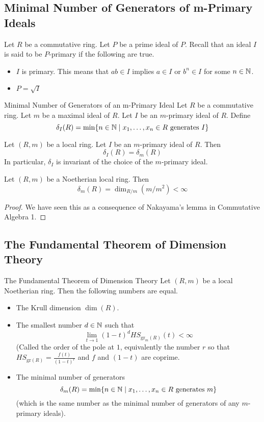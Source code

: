 \documentclass[a4paper]{article}
\begin{document}
\subsection{Minimal Number of Generators of m-Primary Ideals}
Let $R$ be a commutative ring. Let $P$ be a prime ideal of $P$. Recall that an ideal $I$ is said to be $P$-primary if the following are true. 
\begin{itemize}
\item $I$ is primary. This means that $ab\in I$ implies $a\in I$ or $b^n\in I$ for some $n\in\mathbb{N}$. 
\item $P=\sqrt{I}$
\end{itemize}

\begin{defn}{Minimal Number of Generators of an m-Primary Ideal}{} Let $R$ be a commutative ring. Let $m$ be a maximal ideal of $R$. Let $I$ be an $m$-primary ideal of $R$. Define $$\delta_I(R)=\min\{n\in\mathbb{N}\;|\;x_1,\dots,x_n\in R\text{ generates }I\}$$
\end{defn}

\begin{prp}{}{} Let $(R,m)$ be a local ring. Let $I$ be an $m$-primary ideal of $R$. Then $$\delta_I(R)=\delta_m(R)$$ In particular, $\delta_I$ is invariant of the choice of the $m$-primary ideal. 
\end{prp}

\begin{prp}{}{} Let $(R,m)$ be a Noetherian local ring. Then $$\delta_m(R)=\dim_{R/m}(m/m^2)<\infty$$ \tcbline
\begin{proof}
We have seen this as a consequence of Nakayama's lemma in Commutative Algebra 1. 
\end{proof}
\end{prp}

\subsection{The Fundamental Theorem of Dimension Theory}
\begin{thm}{The Fundamental Theorem of Dimension Theory}{} Let $(R,m)$ be a local Noetherian ring. Then the following numbers are equal. 
\begin{itemize}
\item The Krull dimension $\dim(R)$. 
\item The smallest number $d\in\mathbb{N}$ such that $$\lim_{t\to 1}(1-t)^dHS_{\text{gr}_m(R)}(t)<\infty$$ (Called the order of the pole at $1$, equivalently the number $r$ so that $HS_{\text{gr}(R)}=\frac{f(t)}{(1-t)^r}$ and $f$ and $(1-t)$ are coprime. 
\item The minimal number of generators $$\delta_m(R)=\min\{n\in\mathbb{N}\;|\;x_1,\dots,x_n\in R\text{ generates }m\}$$ (which is the same number as the minimal number of generators of any $m$-primary ideals). 
\end{itemize}
\end{thm}
\end{document}
